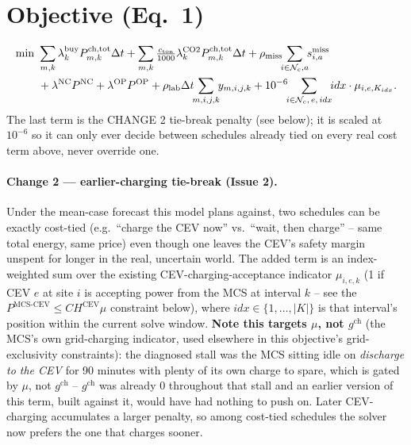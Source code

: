 \documentclass[11pt]{article}
\newcommand{\dt}{\Delta t}
\begin{document}
\section{Objective (Eq.\ 1)}
\begin{align}
\min\ &\sum_{m,k}\lambda^{\text{buy}}_{k}P^{\text{ch,tot}}_{m,k}\dt
      +\sum_{m,k}\tfrac{c_{\text{ton}}}{1000}\lambda^{\text{CO2}}_{k}P^{\text{ch,tot}}_{m,k}\dt
      +\rho_{\text{miss}}\!\!\sum_{i\in\mathcal{N}_c,a}\!\! s^{\text{miss}}_{i,a}\notag\\
     &+\lambda^{\text{NC}}P^{\text{NC}}+\lambda^{\text{OP}}P^{\text{OP}}
      +\rho_{\text{lab}}\dt\!\!\sum_{m,i,j,k}\!\! y_{m,i,j,k}
      +10^{-6}\!\!\sum_{i\in\mathcal{N}_c,\,e,\,idx}\!\! idx\cdot \mu_{i,e,K_{idx}}.
\end{align}
The last term is the CHANGE 2 tie-break penalty (see below); it is scaled at $10^{-6}$ so it can
only ever decide between schedules already tied on every real cost term above, never override one.

\paragraph{Change 2 --- earlier-charging tie-break (Issue 2).} Under the mean-case forecast this
model plans against, two schedules can be exactly cost-tied (e.g.\ ``charge the CEV now'' vs.\
``wait, then charge'' -- same total energy, same price) even though one leaves the CEV's safety
margin unspent for longer in the real, uncertain world. The added term is an index-weighted sum
over the existing CEV-charging-acceptance indicator $\mu_{i,e,k}$ (1 if CEV $e$ at site $i$ is
accepting power from the MCS at interval $k$ -- see the $P^{\text{MCS-CEV}}\le CH^{\text{CEV}}\mu$
constraint below), where $idx\in\{1,\dots,|K|\}$ is that interval's position within the current
solve window. \textbf{Note this targets $\mu$, not $g^{\text{ch}}$} (the MCS's own grid-charging
indicator, used elsewhere in this objective's grid-exclusivity constraints): the diagnosed stall
was the MCS sitting idle on \emph{discharge to the CEV} for 90 minutes with plenty of its own
charge to spare, which is gated by $\mu$, not $g^{\text{ch}}$ -- $g^{\text{ch}}$ was already 0
throughout that stall and an earlier version of this term, built against it, would have had
nothing to push on. Later CEV-charging accumulates a larger penalty, so among cost-tied
schedules the solver
now prefers the one that charges sooner.
\end{document}
